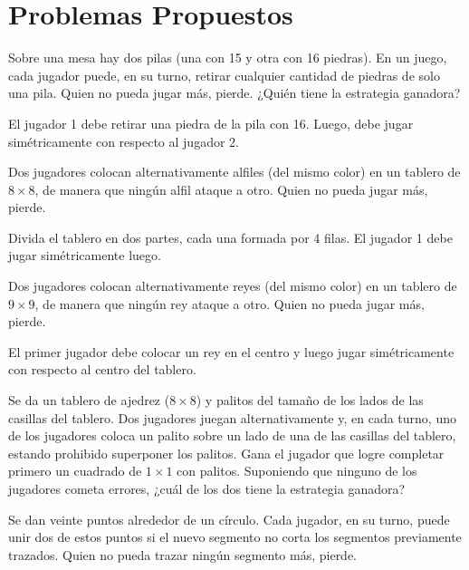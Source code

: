 \documentclass[11pt]{scrartcl}
\begin{document}
\section{Problemas Propuestos}
\begin{problem}
Sobre una mesa hay dos pilas (una con 15 y otra con 16 piedras). En un juego, cada jugador puede, en su turno, retirar cualquier cantidad de piedras de solo una pila. Quien no pueda jugar más, pierde. ¿Quién tiene la estrategia ganadora?
\begin{hint}
El jugador 1 debe retirar una piedra de la pila con 16. Luego, debe jugar simétricamente con respecto al jugador 2.
\end{hint}
\end{problem}

\begin{problem}
Dos jugadores colocan alternativamente alfiles (del mismo color) en un tablero de $8 \times 8$, de manera que ningún alfil ataque a otro. Quien no pueda jugar más, pierde.
\begin{hint}
    Divida el tablero en dos partes, cada una formada por 4 filas. El jugador 1 debe jugar simétricamente luego.
\end{hint}
\end{problem}

\begin{problem}
Dos jugadores colocan alternativamente reyes (del mismo color) en un tablero de $9 \times 9$, de manera que ningún rey ataque a otro. Quien no pueda jugar más, pierde.
\begin{hint}
    El primer jugador debe colocar un rey en el centro y luego jugar simétricamente con respecto al centro del tablero.
\end{hint}
\end{problem}

\begin{problem}
Se da un tablero de ajedrez ($8 \times 8$) y palitos del tamaño de los lados de las casillas del tablero. Dos jugadores juegan alternativamente y, en cada turno, uno de los jugadores coloca un palito sobre un lado de una de las casillas del tablero, estando prohibido superponer los palitos. Gana el jugador que logre completar primero un cuadrado de $1 \times 1$ con palitos. Suponiendo que ninguno de los jugadores cometa errores, ¿cuál de los dos tiene la estrategia ganadora?
\end{problem}

\begin{problem}
Se dan veinte puntos alrededor de un círculo. Cada jugador, en su turno, puede unir dos de estos puntos si el nuevo segmento no corta los segmentos previamente trazados. Quien no pueda trazar ningún segmento más, pierde.
\end{problem}
\end{document}
